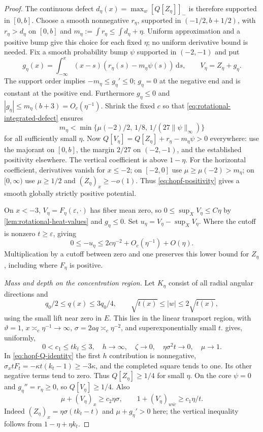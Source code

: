 \begin{proof}
The continuous defect $d_\eta(x)=\max_w[Q[Z_\eta]]_-$ is therefore
supported in $[0,b]$. Choose a smooth nonnegative $r_\eta$, supported in
$(-1/2,b+1/2)$, with $r_\eta>d_\eta$ on $[0,b]$ and
$m_\eta:=\int r_\eta\leq\int d_\eta+\eta$.
Uniform approximation and a positive bump give this choice for each fixed
$\eta$; no uniform derivative bound is needed.
Fix a smooth probability bump $\psi$ supported in $(-2,-1)$ and put
\[
 g_\eta(x)=\int_{-\infty}^x(x-s)(r_\eta(s)-m_\eta\psi(s))\,\mathrm ds,
 \qquad V_\eta=Z_\eta+g_\eta.
\]
The support order implies $-m_\eta\leq g_\eta'\leq0$;
$g_\eta=0$ at the negative end and is constant at the positive end.
Furthermore $g_\eta\leq0$ and $|g_\eta|\leq m_\eta(b+3)=O_c(\eta^{-1})$.
Shrink the fixed $c$ so that \eqref{eq:rotational-integrated-defect} ensures
\[
 m_\eta<\min\{\mu(-2)/2,\,1/8,\,1/(27\|\psi\|_\infty)\}
\]
for all sufficiently small $\eta$.
Now $Q[V_\eta]=Q[Z_\eta]+r_\eta-m_\eta\psi>0$ everywhere:
use the majorant on $[0,b]$, the margin $2/27$ on $(-2,-1)$, and the
established positivity elsewhere.
The vertical coefficient is above $1-\eta$. For the horizontal coefficient,
derivatives vanish for $x\leq-2$; on $[-2,0]$ use $\mu\geq\mu(-2)>m_\eta$;
on $[0,\infty)$ use $\mu\geq1/2$ and $(Z_\eta)_x\geq-o(1)$.
Thus \eqref{eq:hopf-positivity} gives a smooth globally strictly positive potential.

On $x<-3$, $V_\eta=F_\eta(\varepsilon,\cdot)$ has fiber mean zero, so
$0\leq\sup_XV_\eta\leq C\eta$ by \cref{lem:rotational-heat-values} and $g_\eta\leq0$.
Set $u_\eta=V_\eta-\sup_XV_\eta$.
Where the cutoff is nonzero $t\geq\varepsilon$, giving
\begin{equation}\label{eq:rotational-global-depth}
 0\leq-u_\eta\leq2c\eta^{-2}+O_c(\eta^{-1})+O(\eta).
\end{equation}
Multiplication by a cutoff between zero and one preserves this lower bound
for $Z_\eta$, including where $F_\eta$ is positive.

\medskip\noindent\emph{Mass and depth on the concentration region.}
Let $K_\eta$ consist of all radial angular directions and
\[
 q_0/2\leq q(x)\leq3q_0/4,\qquad
 \sqrt{t(x)}\leq|w|\leq2\sqrt{t(x)},
\]
using the small lift near zero in $E$.
This lies in the linear transport region, with $\vartheta=1$,
$x\asymp_c\eta^{-1}\to\infty$, $\sigma=2aq\asymp_c\eta^{-2}$, and
superexponentially small $t$.  gives, uniformly,
\[
 0<c_1\leq tk_t\leq3,\quad h\to\infty,\quad
 \zeta\to0,\quad \eta\sigma^2t\to0,\quad \mu\to1.
\]
In \eqref{eq:hopf-Q-identity} the first $h$ contribution is nonnegative,
$\sigma_xtF_t=-\kappa t(k_t-1)\geq-3\kappa$, and the completed square
tends to one. Its other negative terms tend to zero.
Thus $Q[Z_\eta]\geq1/4$ for small $\eta$. On the core $\psi=0$ and
$g_\eta''=r_\eta\geq0$, so $Q[V_\eta]\geq1/4$. Also
\[
 \mu+(V_\eta)_x\geq c_2\eta\sigma,\qquad
 1+(V_\eta)_{w\bar w}\geq c_1\eta/t.
\]
Indeed $(Z_\eta)_x=\eta\sigma(tk_t-t)$ and $\mu+g_\eta'>0$ here;
the vertical inequality follows from $1-\eta+\eta k_t$.


\end{proof}
